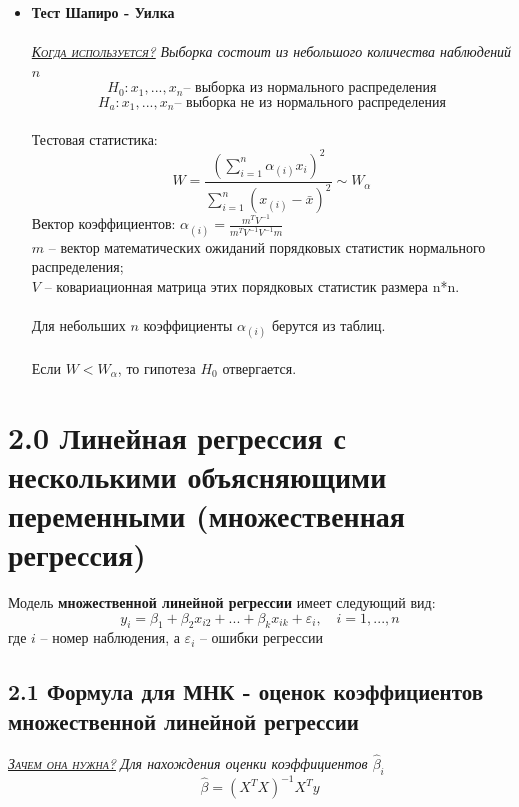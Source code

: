 \documentclass[a0,final]{a0poster}
\begin{document}
\begin{multicols}{4}
\begin{itemize}
\item \textbf{Тест Шапиро - Уилка}\\
\\
\underline{\textsc{\textit{Когда используется?}}} \textit{Выборка состоит из небольшого количества наблюдений $n$}
\[H_0: x_1,...,x_n \text{-- выборка из нормального распределения}\]
\[H_a: x_1,...,x_n \text{-- выборка не из нормального распределения}\]
\\
Тестовая статистика:
\[W=\frac{(\sum\limits_{i = 1}^n{{\alpha}_{(i)}x_{i}})^2}{\sum\limits_{i = 1}^n{(x_{(i)} - \bar{x})^2}} \sim W_\alpha\]
Вектор коэффициентов: ${\alpha}_{(i)} = \frac{m^TV^{-1}}{m^TV^{-1}V^{-1}m}$\\

$m$ -- вектор математических ожиданий порядковых статистик нормального распределения; \\
$V$ -- ковариационная матрица этих порядковых статистик размера n*n.\\
\\
Для небольших $n$ коэффициенты $\alpha_{(i)}$ берутся из таблиц.\\
\\
Если $W<W_\alpha$, то гипотеза $H_0$ отвергается.
\end{itemize}

\columnbreak

\section*{2.0 Линейная регрессия с несколькими объясняющими переменными (множественная регрессия)}
\begin{tcolorbox}[colback=red!5!white,colframe=red!75!black]
Модель \textbf{множественной линейной регрессии} имеет следующий вид:
 $$y_i={\beta}_1 +{\beta}_2x_{i2} + ... + \beta_kx_{ik} + {\varepsilon}_i, \quad i = 1,...,n$$
 где $i$ -- номер наблюдения, а ${\varepsilon}_i$ -- ошибки регрессии
\end{tcolorbox}

\subsection*{\textbf{2.1 Формула для  МНК - оценок коэффициентов множественной линейной регрессии}}
\underline{\textsc{\textit{Зачем она нужна?}}} \textit{Для нахождения оценки коэффициентов $\hat{\beta}_i$}\\
\[\hat{\beta} = (X^TX)^{-1}X^Ty\] \\


\end{multicols}
\end{document}
